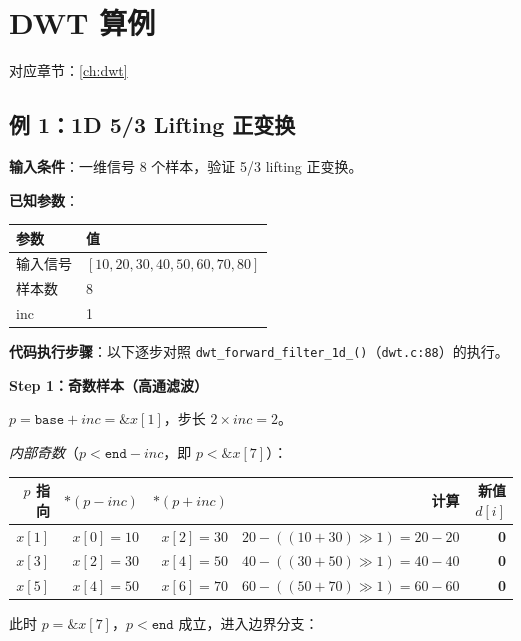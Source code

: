 
\section{DWT 算例}\label{sec:dwt-examples}

对应章节：\cref{ch:dwt}

\subsection{例 1：1D 5/3 Lifting 正变换}

\begin{examplebox}[title={DWT Worked Example 1：1D 5/3 Lifting 正变换}]

\textbf{输入条件}：一维信号 8 个样本，验证 5/3 lifting 正变换。

\textbf{已知参数}：

\begin{tabular}{@{}ll@{}}
\toprule
参数 & 值 \\
\midrule
输入信号 & $[10, 20, 30, 40, 50, 60, 70, 80]$ \\
样本数 & 8 \\
inc & 1 \\
\bottomrule
\end{tabular}

\textbf{代码执行步骤}：以下逐步对照 \texttt{dwt\_forward\_filter\_1d\_()}（\texttt{dwt.c:88}）的执行。

\textbf{Step 1：奇数样本（高通滤波）}

$p = \texttt{base} + \mathit{inc} = \&x[1]$，步长 $2 \times \mathit{inc} = 2$。

\textit{内部奇数}（$p < \texttt{end} - \mathit{inc}$，即 $p < \&x[7]$）：

\begin{tabular}{@{}rrrrr@{}}
\toprule
$p$ 指向 & $*(p-\mathit{inc})$ & $*(p+\mathit{inc})$ & 计算 & 新值 $d[i]$ \\
\midrule
$x[1]$ & $x[0]=10$ & $x[2]=30$ & $20 - ((10+30)\gg1) = 20 - 20$ & \textbf{0} \\
$x[3]$ & $x[2]=30$ & $x[4]=50$ & $40 - ((30+50)\gg1) = 40 - 40$ & \textbf{0} \\
$x[5]$ & $x[4]=50$ & $x[6]=70$ & $60 - ((50+70)\gg1) = 60 - 60$ & \textbf{0} \\
\bottomrule
\end{tabular}

此时 $p = \&x[7]$，$p < \texttt{end}$ 成立，进入边界分支：


\end{examplebox}
